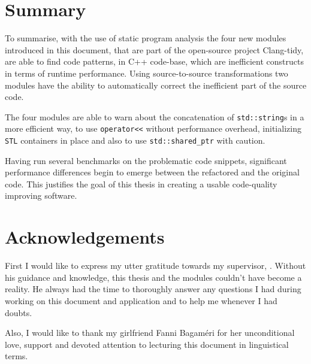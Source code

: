 \section{Summary}
\par To summarise, with the use of static program analysis the four new modules introduced in this document, that are part of the open-source project Clang-tidy, are able to find code patterns, in C++ code-base, which are inefficient constructs in terms of runtime performance. Using source-to-source transformations two modules have the ability to automatically correct the inefficient part of the source code. \medskip
\par The four modules are able to warn about the concatenation of \verb|std::string|s in a more efficient way, to use \verb|operator<<| without performance overhead, initializing \verb|STL| containers in place and also to use \verb|std::shared_ptr| with caution. \medskip
\par Having run several benchmarks on the problematic code snippets, significant performance differences begin to emerge between the refactored and the original code. This justifies the goal of this thesis in creating a usable code-quality improving software.
\pagebreak
\section{Acknowledgements}
\par First I would like to express my utter gratitude towards my supervisor, \SupervisorName. Without his guidance and knowledge, this thesis and the modules couldn't have become a reality. He always had the time to thoroughly answer any questions I had during working on this document and application and to help me whenever I had doubts. \medskip
\par Also, I would like to thank my girlfriend Fanni Bagaméri for her unconditional love, support and devoted attention to lecturing this document in linguistical terms.